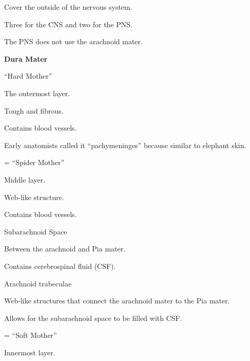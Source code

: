 \begin{coloredlist}
    \item Cover the outside of the nervous system.
    \begin{coloredlist}
        \item Three for the CNS and two for the PNS.
        \item The PNS does not use the arachnoid mater.
    \end{coloredlist}
    \item \textbf{Dura Mater}
    \begin{coloredlist}
        \item ``Hard Mother''
        \item The outermost layer.
        \item Tough and fibrous.
        \item Contains blood vessels.
        \item Early anatomists called it ``pachymeninges'' because similar to elephant skin.
    \end{coloredlist}
    \item {} = ``Spider Mother''
    \begin{coloredlist}
        \item Middle layer.
        \item Web-like structure.
        \item Contains blood vessels.
        \item Subarachnoid Space
        \begin{coloredlist}
            \item Between the arachnoid and Pia mater.
            \item Contains cerebrospinal fluid (CSF).
        \end{coloredlist}
        \item Arachnoid trabeculae
        \begin{coloredlist}
            \item Web-like structures that connect the arachnoid mater to the Pia mater.
            \item Allows for the subarachnoid space to be filled with CSF.
        \end{coloredlist}
    \end{coloredlist}
    \item {} = ``Soft Mother''
    \begin{coloredlist}
        \item Innermost layer.

\end{coloredlist}
\end{coloredlist}
